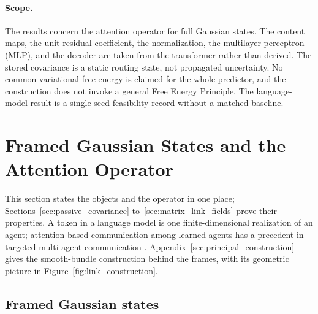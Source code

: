 \documentclass[twoside,11pt]{article}
\begin{document}
\paragraph{Scope.} The results concern the attention operator for full Gaussian states. The content maps, the unit residual coefficient, the normalization, the multilayer perceptron (MLP), and the decoder are taken from the transformer rather than derived. The stored covariance is a static routing state, not propagated uncertainty. No common variational free energy is claimed for the whole predictor, and the construction does not invoke a general Free Energy Principle. The language-model result is a single-seed feasibility record without a matched baseline.

\section{Framed Gaussian States and the Attention Operator}
\label{sec:construction_overview}

This section states the objects and the operator in one place; Sections~\ref{sec:passive_covariance} to~\ref{sec:matrix_link_fields} prove their properties. A token in a language model is one finite-dimensional realization of an agent; attention-based communication among learned agents has a precedent in targeted multi-agent communication \citep{Das2019TarMAC}. Appendix~\ref{sec:principal_construction} gives the smooth-bundle construction behind the frames, with its geometric picture in Figure~\ref{fig:link_construction}.

\subsection{Framed Gaussian states}
\label{sec:framed_states}
\end{document}
